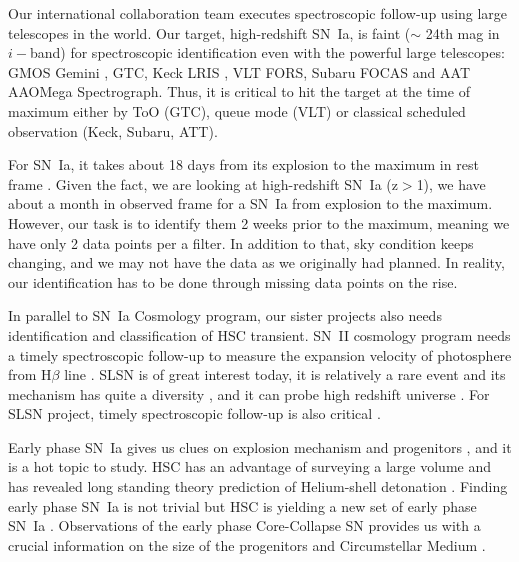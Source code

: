 \documentclass[useamsfonts]{pasj01}
\begin{document}
Our international collaboration team executes spectroscopic follow-up using large telescopes in the world.  
Our target, high-redshift SN~Ia, is faint ($\sim$ 24th mag in $i-$band) for spectroscopic identification even with the powerful large telescopes: GMOS Gemini \citep{hook04a}, GTC, Keck LRIS \citep{oke95a}, VLT FORS, Subaru FOCAS \citep{kashikawa02a} and AAT AAOMega Spectrograph.  
Thus, it is critical to hit the target at the time of maximum either by ToO (GTC), queue mode (VLT) or classical scheduled observation (Keck, Subaru, ATT).

For SN~Ia, it takes about 18 days from its explosion to the maximum in rest frame \citep{conley06a,papadogiannakis19a}.   Given the fact, we are looking at high-redshift SN~Ia (z$>$1), we have about a month in observed frame for a SN~Ia from explosion to the maximum.   However, our task is to identify them 2 weeks prior to the maximum, meaning we have only 2 data points per a filter.   In addition to that, sky condition keeps changing, and we may not have the data as we originally had planned.   In reality, our identification has to be done through missing data points on the rise.

In parallel to SN~Ia Cosmology program, our sister projects also needs identification and classification of HSC transient.   
SN~II cosmology program needs a timely spectroscopic follow-up to measure the expansion velocity of photosphere from H$\beta$ line \citep{dejaeger17a}.
SLSN is of great interest today, it is relatively a rare event\citep{quimby11a} and its mechanism has quite a diversity \citep{galyam12a,Moriya18SLSN}, and it can probe high redshift universe \citep{cooke12a}.    
For SLSN project, timely spectroscopic follow-up is also critical \citep{moriya19a,curtin19a}.

Early phase SN~Ia gives us clues on explosion mechanism \citep{maeda18a} and progenitors \citep{cao15a}, and it is a hot topic to study.
HSC has an advantage of surveying a large volume and has revealed long standing theory prediction of Helium-shell detonation \citep{Jiang2017}.
Finding early phase SN~Ia is not trivial but HSC is yielding a new set of early phase SN~Ia \citep{Jiang_2020}.
Observations of the early phase Core-Collapse SN provides us with a crucial information on the size of the progenitors \citep{thompson03a,tominaga11a} and Circumstellar Medium \citep{forster18a}.  

\end{document}
